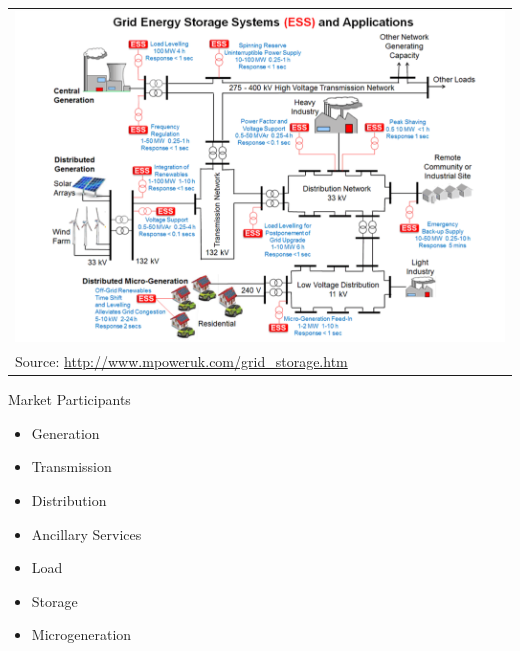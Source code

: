 \documentclass{beamer}
\renewcommand{\(}{\begin{columns}}
\renewcommand{\)}{\end{columns}}
\newcommand{\<}[1]{\begin{column}{#1}}
\renewcommand{\>}{\end{column}}
\begin{document}
\begin{frame}

\begin{tabular}{p{\linewidth}}
    \centering
    \includegraphics[width=.9\linewidth]{../images/grid_storage.png} \\[\abovecaptionskip]
  Source: \url{http://www.mpoweruk.com/grid_storage.htm}
\end{tabular}

\end{frame}

\begin{frame}{Market Participants}
\begin{itemize}
\setlength\itemsep{1.7em}
\item Generation

\item Transmission

\item Distribution

\item Ancillary Services

\item Load

\item Storage

\item Microgeneration
\end{itemize}

\vfill \end{frame}
\end{document}
